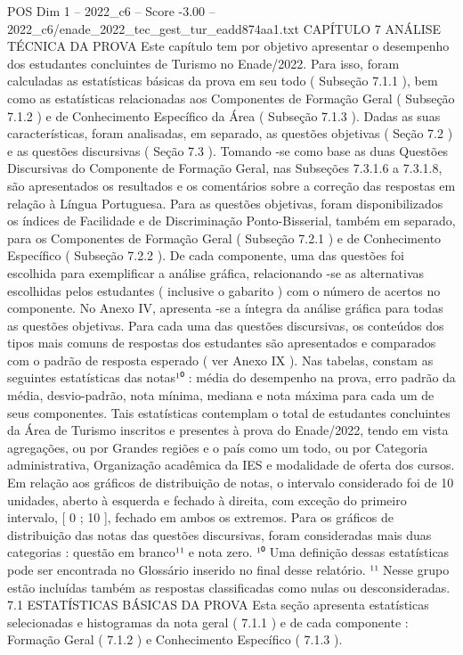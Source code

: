 \begin{textsample}{POS Dim 1 – 2022\_c6 – Score -3.00 – 2022\_c6/enade\_2022\_tec\_gest\_tur\_eadd874aa1.txt}  \label{ex:f1_pos_268}
CAPÍTULO 7 ANÁLISE TÉCNICA DA PROVA Este capítulo tem por objetivo apresentar o desempenho dos estudantes concluintes de Turismo no Enade/2022.
Para isso, foram calculadas as estatísticas básicas da prova em seu todo ( Subseção 7.1.1 ), bem como as estatísticas relacionadas aos Componentes de Formação Geral ( Subseção 7.1.2 ) e de Conhecimento Específico da Área ( Subseção 7.1.3 ).
Dadas as suas características, foram analisadas, em separado, as questões objetivas ( Seção 7.2 ) e as questões discursivas ( Seção 7.3 ).
Tomando -se como base as duas Questões Discursivas do Componente de Formação Geral, nas Subseções 7.3.1.6 a 7.3.1.8, são apresentados os resultados e os comentários sobre a correção das respostas em relação à Língua Portuguesa.
Para as questões objetivas, foram disponibilizados os índices de Facilidade e de Discriminação Ponto-Bisserial, também em separado, para os Componentes de Formação Geral ( Subseção 7.2.1 ) e de Conhecimento Específico ( Subseção 7.2.2 ).
De cada componente, uma das questões foi escolhida para exemplificar a análise gráfica, relacionando -se as alternativas escolhidas pelos estudantes ( inclusive o gabarito ) com o número de acertos no componente.
No Anexo IV, apresenta -se a íntegra da análise gráfica para todas as questões objetivas.
Para cada uma das questões discursivas, os conteúdos dos tipos mais comuns de respostas dos estudantes são apresentados e comparados com o padrão de resposta esperado ( ver Anexo IX ).
Nas tabelas, constam as seguintes estatísticas das notas¹⁰ : média do desempenho na prova, erro padrão da média, desvio-padrão, nota mínima, mediana e nota máxima para cada um de seus componentes.
Tais estatísticas contemplam o total de estudantes concluintes da Área de Turismo inscritos e presentes à prova do Enade/2022, tendo em vista agregações, ou por Grandes regiões e o país como um todo, ou por Categoria administrativa, Organização acadêmica da IES e modalidade de oferta dos cursos.
Em relação aos gráficos de distribuição de notas, o intervalo considerado foi de 10 unidades, aberto à esquerda e fechado à direita, com exceção do primeiro intervalo, [ 0 ; 10 ], fechado em ambos os extremos.
Para os gráficos de distribuição das notas das questões discursivas, foram consideradas mais duas categorias : questão em branco¹¹ e nota zero. ¹⁰ Uma definição dessas estatísticas pode ser encontrada no Glossário inserido no final desse relatório. ¹¹ Nesse grupo estão incluídas também as respostas classificadas como nulas ou desconsideradas. 7.1 ESTATÍSTICAS BÁSICAS DA PROVA Esta seção apresenta estatísticas selecionadas e histogramas da nota geral ( 7.1.1 ) e de cada componente : Formação Geral ( 7.1.2 ) e Conhecimento Específico ( 7.1.3 ).

\end{textsample}
